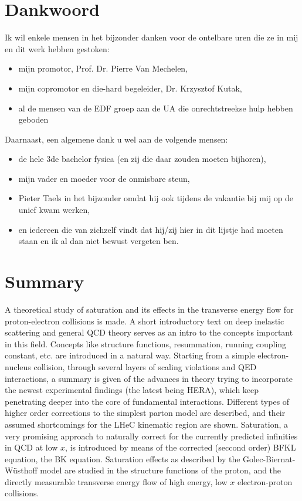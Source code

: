 \documentclass[a4paper,11pt]{article}
\numberwithin{equation}{section} %
\begin{document}
\section*{Dankwoord}
Ik wil enkele mensen in het bijzonder danken voor de ontelbare uren die ze in mij en dit werk hebben gestoken:
\begin{itemize}
  \item mijn promotor, Prof. Dr. Pierre Van Mechelen,
  \item mijn copromotor en die-hard begeleider, Dr. Krzysztof Kutak,
  \item al de mensen van de EDF groep aan de UA die onrechtstreekse hulp hebben geboden
\end{itemize}
Daarnaast, een algemene dank u wel aan de volgende mensen:
\begin{itemize}
  \item de hele 3de bachelor fysica (en zij die daar zouden moeten bijhoren),
  \item mijn vader en moeder voor de onmisbare steun,
  \item Pieter Taels in het bijzonder omdat hij ook tijdens de vakantie bij mij op de unief kwam werken,
  \item en iedereen die van zichzelf vindt dat hij/zij hier in dit lijstje had moeten staan en ik al dan niet bewust vergeten ben.
\end{itemize}

\thispagestyle{empty}
\newpage
\fontsize{11pt}{14pt}\selectfont

\section*{Summary}
A theoretical study of saturation and its effects in the transverse energy flow for proton-electron collisions is made.
A short introductory text on deep inelastic scattering and general QCD theory serves as an intro to the concepts important in this field.
Concepts like structure functions, resummation, running coupling constant, etc. are introduced in a natural way.
Starting from a simple electron-nucleus collision, through several layers of scaling violations and QED interactions, a summary is given of the advances in theory trying to incorporate the newest experimental findings (the latest being HERA), which keep penetrating deeper into the core of fundamental interactions.
Different types of higher order corrections to the simplest parton model are described, and their assumed shortcomings for the LHeC kinematic region are shown.
Saturation, a very promising approach to naturally correct for the currently predicted infinities in QCD at low $x$, is introduced by means of the corrected (seccond order) BFKL equation, the BK equation.
Saturation effects as described by the Golec-Biernat-Wüsthoff model are studied in the structure functions of the proton, and the directly measurable transverse energy flow of high energy, low $x$ electron-proton collisions.
\end{document}
